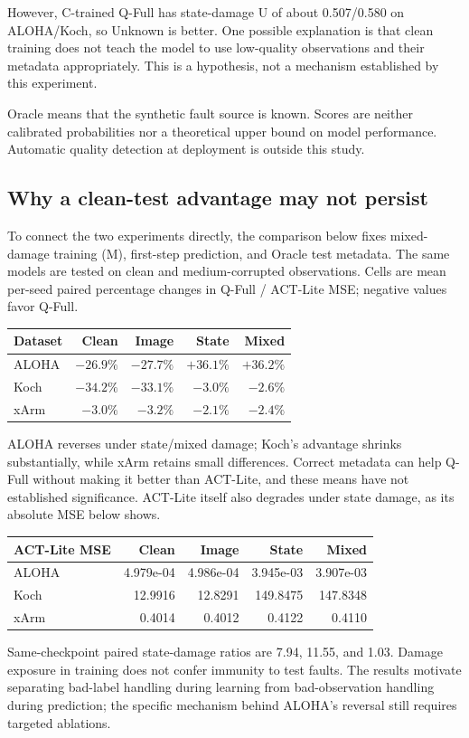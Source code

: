 \documentclass[11pt,a4paper]{article}
\newcommand{\note}[1]{\begin{tcolorbox}[colback=panel,colframe=rule,boxrule=0.5pt,arc=1mm]#1\end{tcolorbox}}
\begin{document}
However, C-trained Q-Full has state-damage U of about 0.507/0.580 on ALOHA/Koch, so Unknown is better. One possible explanation is that clean training does not teach the model to use low-quality observations and their metadata appropriately. This is a hypothesis, not a mechanism established by this experiment.

\note{Oracle means that the synthetic fault source is known. Scores are neither calibrated probabilities nor a theoretical upper bound on model performance. Automatic quality detection at deployment is outside this study.}
\clearpage\subsection{Why a clean-test advantage may not persist}
To connect the two experiments directly, the comparison below fixes mixed-damage training (M), first-step prediction, and Oracle test metadata. The same models are tested on clean and medium-corrupted observations. Cells are mean per-seed paired percentage changes in Q-Full / ACT-Lite MSE; negative values favor Q-Full.

\begin{center}
\small
\begin{tabular}{lrrrr}
\toprule
Dataset & Clean & Image & State & Mixed \\
\midrule
ALOHA & $-26.9\%$ & $-27.7\%$ & $+36.1\%$ & $+36.2\%$ \\
Koch & $-34.2\%$ & $-33.1\%$ & $-3.0\%$ & $-2.6\%$ \\
xArm & $-3.0\%$ & $-3.2\%$ & $-2.1\%$ & $-2.4\%$ \\
\bottomrule
\end{tabular}
\end{center}
ALOHA reverses under state/mixed damage; Koch's advantage shrinks substantially, while xArm retains small differences. Correct metadata can help Q-Full without making it better than ACT-Lite, and these means have not established significance. ACT-Lite itself also degrades under state damage, as its absolute MSE below shows.

\begin{center}
\small
\begin{tabular}{lrrrr}
\toprule
ACT-Lite MSE & Clean & Image & State & Mixed \\
\midrule
ALOHA & 4.979e-04 & 4.986e-04 & 3.945e-03 & 3.907e-03 \\
Koch & 12.9916 & 12.8291 & 149.8475 & 147.8348 \\
xArm & 0.4014 & 0.4012 & 0.4122 & 0.4110 \\
\bottomrule
\end{tabular}
\end{center}
Same-checkpoint paired state-damage ratios are 7.94, 11.55, and 1.03. Damage exposure in training does not confer immunity to test faults. The results motivate separating bad-label handling during learning from bad-observation handling during prediction; the specific mechanism behind ALOHA's reversal still requires targeted ablations.
\end{document}
